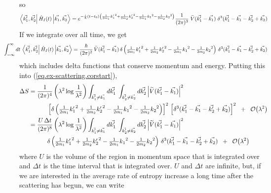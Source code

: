 so 
\[
\left\langle\vec{k_1^\prime}, \vec{k_2^\prime}\right| \hat{H}_I(t)\left|\vec{k_1}, \vec{k_2}\right\rangle
=
e^{-\frac{i}{\hbar}\left(t-t_0\right)\left(\frac{1}{2m_1}{{k_1^\prime}}^2 + \frac{1}{2m_2}{{k_2^\prime}}^2 - \frac{1}{2m_1}{k_1}^2 - \frac{1}{2m_2}{k_2}^2\right)}\frac{1}{(2\pi)^3}\;\widetilde{V}(\vec{k_1^\prime}-\vec{k_1}) \;\delta^3(\vec{k_1^\prime}-\vec{k_1}-\vec{k_2^\prime}+\vec{k_2})
\]
If we integrate over all time, we get
\[
\hspace{-3em}
\int_{-\infty}^\infty dt \,\bra{\vec{k_1^\prime}, \vec{k_2^\prime}} \op{H}_I(t)\ket{\vec{k_1}, \vec{k_2}}
=
\frac{\hbar}{(2\pi)^2}\,\widetilde{V}(\vec{k_1^\prime}-\vec{k_1})\,\delta\left({\textstyle\frac{1}{2m_1}{{k_1^\prime}}^2 + \frac{1}{2m_2}{{k_2^\prime}}^2 - \frac{1}{2m_1}{k_1}^2 - \frac{1}{2m_2}{k_2}^2}\right) \,\delta^3(\vec{k_1^\prime}-\vec{k_1}-\vec{k_2^\prime}+\vec{k_2})
\]
which includes delta functions that conserve momentum and energy.
Putting this into (\ref{eq.ex-scattering.corstart}),
\begin{align*}
\Delta S
&=\frac{1}{(2\pi)^4}\left(\lambda^2 \log\frac{1}{\lambda^2}\right) \int_{\vec{k_1^\prime}\neq \vec{k_1}} d\vec{k_1^\prime} \;\int_{\vec{k_2^\prime}\neq \vec{k_2}} d\vec{k_2^\prime} \left|\widetilde{V}(\vec{k_1^\prime}-\vec{k_1})\right|^2
\\&\hspace{3em}\left[\delta\left({\textstyle\frac{1}{2m_1}{{k_1^\prime}}^2 + \frac{1}{2m_2}{{k_2^\prime}}^2 - \frac{1}{2m_1}{k_1}^2 - \frac{1}{2m_2}{k_2}^2}\right)\right]^2 \,\left[\delta^3(\vec{k_1^\prime}-\vec{k_1}-\vec{k_2^\prime}+\vec{k_2})\right]^2 \;\;+\;\; \mathcal{O}{\left(\lambda^2\right)} \\
&=\frac{U \,\Delta t}{(2\pi)^8}\left(\lambda^2 \log\frac{1}{\lambda^2}\right) \int_{\vec{k_1^\prime}\neq \vec{k_1}} d\vec{k_1^\prime} \;\int_{\vec{k_2^\prime}\neq \vec{k_2}} d\vec{k_2^\prime} \left|\widetilde{V}(\vec{k_1^\prime}-\vec{k_1})\right|^2
\\&\hspace{3em}\delta\left({\textstyle\frac{1}{2m_1}{{k_1^\prime}}^2 + \frac{1}{2m_2}{{k_2^\prime}}^2 - \frac{1}{2m_1}{k_1}^2 - \frac{1}{2m_2}{k_2}^2}\right) \,\delta^3(\vec{k_1^\prime}-\vec{k_1}-\vec{k_2^\prime}+\vec{k_2}) \;\;+\;\; \mathcal{O}{\left(\lambda^2\right)}
\end{align*}
where \(U\) is the volume of the region in momentum space that is integrated over and \(\Delta t\) is the time interval that is integrated over. \(U\) and \(\Delta t\) are infinite, but, if we are interested in the average rate of entropy increase a long time after the scattering has begun, we can write

